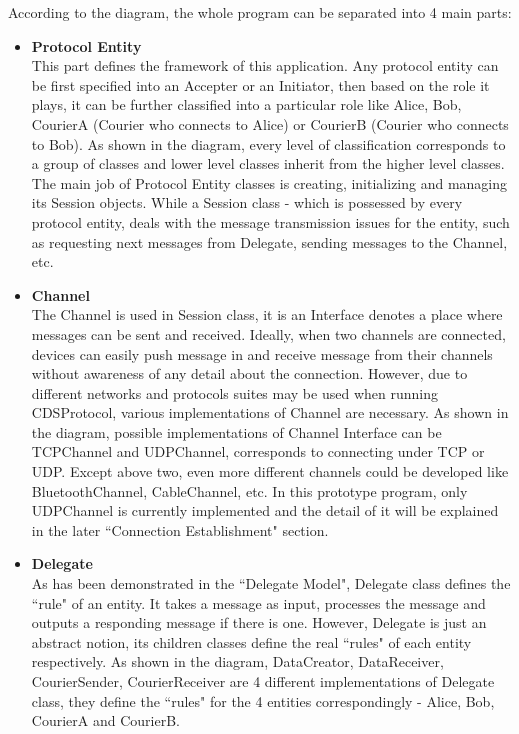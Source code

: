 According to the diagram, the whole program can be separated into 4 main parts:
\begin{itemize}
\item \textbf{Protocol Entity} \\
This part defines the framework of this application. Any protocol entity can be first specified into an Accepter or an Initiator, then based on the role it plays, it can be further classified into a particular role like Alice, Bob, CourierA (Courier who connects to Alice) or CourierB (Courier who connects to Bob). As shown in the diagram, every level of classification corresponds to a group of classes and lower level classes inherit from the higher level classes. The main job of Protocol Entity classes is creating, initializing and managing its Session objects. While a Session class - which is possessed by every protocol entity, deals with the message transmission issues for the entity, such as requesting next messages from Delegate, sending messages to the Channel, etc.

\item \textbf{Channel} \\
The Channel is used in Session class, it is an Interface denotes a place where messages can be sent and received. Ideally, when two channels are connected, devices can easily push message in and receive message from their channels without awareness of any detail about the connection. However, due to different networks and protocols suites may be used when running CDSProtocol, various implementations of Channel are necessary. As shown in the diagram, possible implementations of Channel Interface can be TCPChannel and UDPChannel, corresponds to connecting under TCP or UDP. Except above two, even more different channels could be developed like BluetoothChannel, CableChannel, etc. In this prototype program, only UDPChannel is currently implemented and the detail of it will be explained in the later ``Connection Establishment" section.

\item \textbf{Delegate} \\
As has been demonstrated in the ``Delegate Model", Delegate class defines the ``rule" of an entity. It takes a message as input, processes the message and outputs a responding message if there is one. However, Delegate is just an abstract notion, its children classes define the real ``rules" of each entity respectively. As shown in the diagram, DataCreator, DataReceiver, CourierSender, CourierReceiver are 4 different implementations of Delegate class, they define the ``rules" for the 4 entities correspondingly - Alice, Bob, CourierA and CourierB.


\end{itemize}
